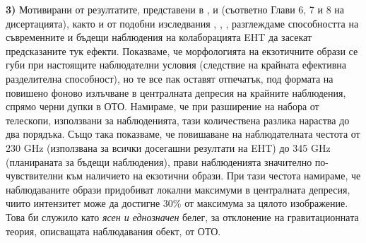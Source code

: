 \textbf{3)} Мотивирани от резултатите, представени в \cite{Deliyski2022}, \cite{Delijski2022} и \cite{Deliyski2023} (съответно Глави 6, 7 и 8 на дисертацията), както и от подобни изследвания \cite{Eichhorn2022}, \cite{Qin2021}, \cite{Geometric_Modeling}, разглеждаме способността на съвременните и бъдещи наблюдения на колаборацията EHT да засекат предсказаните тук ефекти. Показваме, че морфологията на екзотичните образи се губи при настоящите наблюдателни условия (следствие на крайната ефективна разделителна способност), но те все пак оставят отпечатък, под формата на повишено фоново излъчване в централната депресия на крайните наблюдения, спрямо черни дупки в ОТО. Намираме, че при разширение на набора от телескопи, използвани за наблюденията, тази количествена разлика нараства до два порядъка. Също така показваме, че повишаване на наблюдателната честота от $230$ GHz (използвана за всички досегашни резултати на EHT) до 345 GHz (планираната за бъдещи наблюдения), прави наблюденията значително по-чувствителни към наличието на екзотични образи. При тази честота намираме, че наблюдаваните образи придобиват локални максимуми в централната депресия, чиито интензитет може да достигне 30\% от максимума за цялото изображение. Това би служило като \emph{ясен и еднозначен} белег, за отклонение на гравитационната теория, описващата наблюдавания обект, от ОТО.
